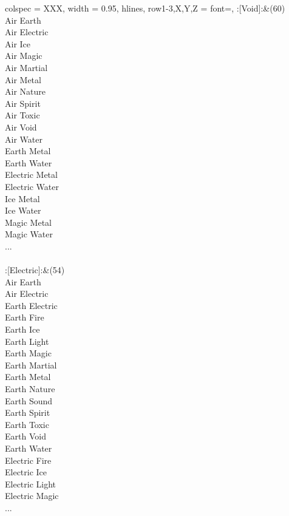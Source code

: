 \begin{longtblr}[
	caption = {1v2 Attacking Ineffective},
	label = {1v2-Attacking-Ineffective},
]{
	colspec = {XXX}, width = 0.95\linewidth,
	hlines,
	row{1-3,X,Y,Z} = {font=\bfseries},
}
	:[Void]:&{(60)\\
	Air Earth \\
	Air Electric \\
	Air Ice \\
	Air Magic \\
	Air Martial \\
	Air Metal \\
	Air Nature \\
	Air Spirit \\
	Air Toxic \\
	Air Void \\
	Air Water \\
	Earth Metal \\
	Earth Water \\
	Electric Metal \\
	Electric Water \\
	Ice Metal \\
	Ice Water \\
	Magic Metal \\
	Magic Water \\
	...\\
	}\\

	:[Electric]:&{(54)\\
	Air Earth \\
	Air Electric \\
	Earth Electric \\
	Earth Fire \\
	Earth Ice \\
	Earth Light \\
	Earth Magic \\
	Earth Martial \\
	Earth Metal \\
	Earth Nature \\
	Earth Sound \\
	Earth Spirit \\
	Earth Toxic \\
	Earth Void \\
	Earth Water \\
	Electric Fire \\
	Electric Ice \\
	Electric Light \\
	Electric Magic \\
	...\\
	}\\


\end{longtblr}
